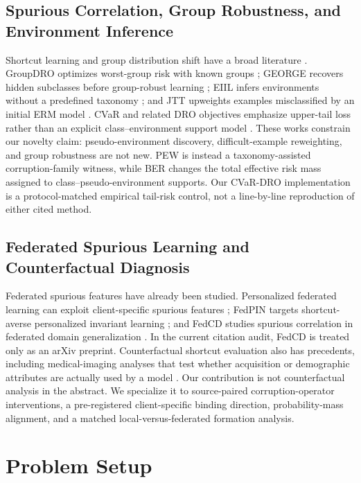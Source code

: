 \documentclass[10pt,twocolumn]{article}
\begin{document}
\subsection{Spurious Correlation, Group Robustness, and Environment Inference}

Shortcut learning and group distribution shift have a broad literature \citep{geirhos2020shortcut}. GroupDRO optimizes worst-group risk with known groups \citep{sagawa2020groupdro}; GEORGE recovers hidden subclasses before group-robust learning \citep{sohoni2020george}; EIIL infers environments without a predefined taxonomy \citep{creager2021eiil}; and JTT upweights examples misclassified by an initial ERM model \citep{liu2021jtt}. CVaR and related DRO objectives emphasize upper-tail loss rather than an explicit class--environment support model \citep{rockafellar2000cvar,duchi2021uniform}. These works constrain our novelty claim: pseudo-environment discovery, difficult-example reweighting, and group robustness are not new. PEW is instead a taxonomy-assisted corruption-family witness, while BER changes the total effective risk mass assigned to class--pseudo-environment supports. Our CVaR-DRO implementation is a protocol-matched empirical tail-risk control, not a line-by-line reproduction of either cited method.

\subsection{Federated Spurious Learning and Counterfactual Diagnosis}

Federated spurious features have already been studied. Personalized federated learning can exploit client-specific spurious features \citep{wang2024pflspurious}; FedPIN targets shortcut-averse personalized invariant learning \citep{tang2024fedpin}; and FedCD studies spurious correlation in federated domain generalization \citep{ma2024fedcd}. In the current citation audit, FedCD is treated only as an arXiv preprint. Counterfactual shortcut evaluation also has precedents, including medical-imaging analyses that test whether acquisition or demographic attributes are actually used by a model \citep{vigneshwaran2026counterfactual,jabbour2020chestxray}. Our contribution is not counterfactual analysis in the abstract. We specialize it to source-paired corruption-operator interventions, a pre-registered client-specific binding direction, probability-mass alignment, and a matched local-versus-federated formation analysis.

\section{Problem Setup}
\end{document}
